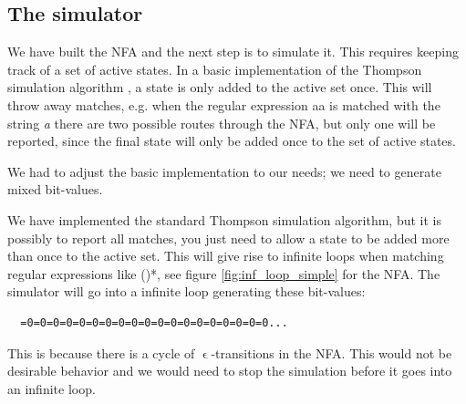 \subsection{The simulator}

We have built the NFA and the next step is to simulate it. This
requires keeping track of a set of active states. In a basic
implementation of the Thompson simulation algorithm
\cite{Thompson1968}, a state is only added to the active set
once. This will throw away matches, e.g. when the regular expression
\textsf{a\textbar a} is matched with the string \textsl{a} there are
two possible routes through the NFA, but only one will be reported,
since the final state will only be added once to the set of active
states.

We had to adjust the basic implementation to our needs; we need to
generate mixed bit-values. 


We have implemented the standard Thompson simulation algorithm, but it
is possibly to report all matches, you just need to allow a state to
be added more than once to the active set. This will give rise to
infinite loops when matching regular expressions like \textsf{()*},
see figure \vref{fig:inf_loop_simple} for the NFA. The simulator will
go into a infinite loop generating these bit-values:
\begin{verbatim}
  =0=0=0=0=0=0=0=0=0=0=0=0=0=0=0=0=0=0=0...
\end{verbatim}
This is because there is a cycle of $\upvarepsilon$-transitions in the
NFA.  This would not be desirable
behavior and we would need to stop the simulation before it goes into
an infinite loop.


